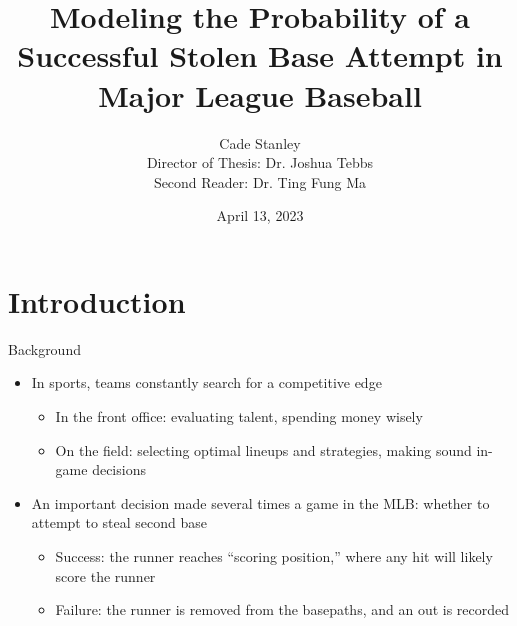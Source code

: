 \documentclass[10pt]{beamer}
\title[Modeling Stolen Base Outcomes]{Modeling the Probability of a Successful Stolen Base Attempt in Major League Baseball}
\author[Cade Stanley]{Cade Stanley \\{\scriptsize Director of Thesis: Dr. Joshua Tebbs} \\{\scriptsize Second Reader: Dr. Ting Fung Ma}}
\institute[University of South Carolina]{University of South Carolina Honors College}
\date[April 13, 2023]{April 13, 2023}
\begin{document}
\frame{\titlepage}

\section{Introduction}
\begin{frame}{Background}
\begin{itemize}
    \item In sports, teams constantly search for a competitive edge
    \begin{itemize}
        \item In the front office: evaluating talent, spending money wisely

        \item On the field: selecting optimal lineups and strategies, making sound in-game decisions
    \end{itemize}
    \vspace{3mm}
    \item An important decision made several times a game in the MLB: whether to attempt to steal second base
    \begin{itemize}
        \item Success: the runner reaches ``scoring position,'' where any hit will likely score the runner

        \item Failure: the runner is removed from the basepaths, and an out is recorded
    \end{itemize}
\end{itemize}
\end{frame}
\end{document}
